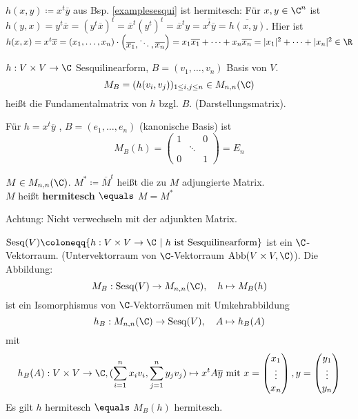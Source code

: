 \documentclass{article}
\begin{document}
    \begin{bsp}
        $h(x,y) \coloneqq x^t\overline{y}$ aus Bsp. \ref{examplesesqui} ist hermitesch:
        Für $x, y\in \C^n$ ist $h(y,x) = y^t\overline{x} = (y^t\overline{x})^t = \overline{x}^t (y^t)^t = \overline{x}^t y = \overline{x^t\overline{y}} = \overline{h(x,y)}$.
        Hier ist $h(x,x) = x^t\overline{x} = (x_1, \dots, x_n) \cdot \begin{pmatrix}
            \overline{x_1}, \ddots, \overline{x_n}
        \end{pmatrix} = x_1\overline{x_1} + \dots + x_n\overline{x_n} = |x_1|^2 + \dots + |x_n|^2 \in \R$
    \end{bsp}
    \begin{definition}
        $h: V\times V \to \C$ Sesquilinearform, $B = (v_1, \dots, v_n)$ Basis von $V$.
        $$M_B = (h(v_i, v_j))_{1\leq i, j\leq n} \in M_{n,n}(\C)$$
        heißt die Fundamentalmatrix von $h$ bzgl. $B$. (Darstellungsmatrix).
    \end{definition}
    \begin{bsp}
        Für $h = x^t\overline{y}$ , $B = (e_1, \dots, e_n)$ (kanonische Basis) ist $$M_B (h) = \begin{pmatrix}
            1 & & 0\\
             & \ddots & \\
             0 && 1
        \end{pmatrix} = E_n$$ 
    \end{bsp}
    \begin{definition}
        \label{def:adjungiert}
        $M \in M_{n,n} (\C)$.
        $M^* \coloneqq \overline{M}^t$ heißt die zu $M$ adjungierte Matrix.\\
        $M$ heißt \textbf{hermitesch} $\equals$ $M = M^*$
    \end{definition}
    \begin{anmerkung}
        Achtung: Nicht verwechseln mit der adjunkten Matrix.
    \end{anmerkung}
    \begin{satz}
        $\operatorname{Sesq} (V) \coloneqq \{h : V \times V \to \C\ |\ h \text{ ist Sesquilinearform}\}$ ist ein $\C$-Vektorraum. (Untervektorraum von $\C$-Vektorraum $\operatorname{Abb} (V\times V, \C)$).
        Die Abbildung:
        $$M_B: \operatorname{Sesq} (V) \to M_{n,n}(\C),\quad h \mapsto M_B(h)$$ ist ein Isomorphismus von $\C$-Vektorräumen mit Umkehrabbildung
        $$h_B : M_{n,n}(\C) \to \operatorname{Sesq}(V), \quad A\mapsto h_B(A)$$ mit $$h_B(A): V\times V \to \C, (\sum_{i = 1}^{n}x_iv_i, \sum_{j = 1}^{n} y_jv_j) \mapsto x^t A \overline{y} \text{ mit } x = \begin{pmatrix}
            x_1\\\vdots\\x_n
        \end{pmatrix}, 
        y = \begin{pmatrix}
            y_1\\\vdots\\y_n
        \end{pmatrix}$$
        Es gilt $h$ hermitesch $\equals$ $M_B(h)$ hermitesch.
    \end{satz}
\end{document}

